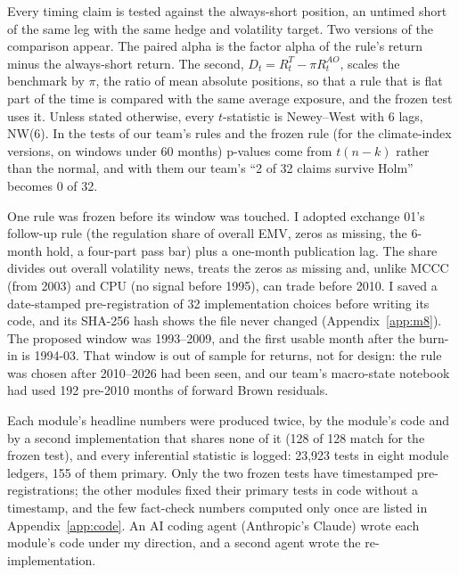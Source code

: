 Every timing claim is tested against the always-short position, an untimed short of the same leg with the same hedge and volatility target. Two versions of the comparison appear. The paired alpha is the factor alpha of the rule's return minus the always-short return. The second, $D_t=R^T_t-\pi R^{AO}_t$, scales the benchmark by $\pi$, the ratio of mean absolute positions, so that a rule that is flat part of the time is compared with the same average exposure, and the frozen test uses it. Unless stated otherwise, every $t$-statistic is Newey--West \citep{nw1987} with 6 lags, NW(6). In the tests of our team's rules and the frozen rule (for the climate-index versions, on windows under 60 months) p-values come from $t(n-k)$ rather than the normal, and with them our team's ``2 of 32 claims survive Holm'' \citep{holm1979} becomes 0 of 32.

One rule was frozen before its window was touched. I adopted exchange 01's follow-up rule (the regulation share of overall EMV, zeros as missing, the 6-month hold, a four-part pass bar) plus a one-month publication lag. The share divides out overall volatility news, treats the zeros as missing and, unlike MCCC (from 2003) and CPU (no signal before 1995), can trade before 2010. I saved a date-stamped pre-registration of 32 implementation choices before writing its code, and its SHA-256 hash shows the file never changed (Appendix~\ref{app:m8}). The proposed window was 1993--2009, and the first usable month after the burn-in is 1994-03. That window is out of sample for returns, not for design: the rule was chosen after 2010--2026 had been seen, and our team's macro-state notebook had used 192 pre-2010 months of forward Brown residuals.

Each module's headline numbers were produced twice, by the module's code and by a second implementation that shares none of it (128 of 128 match for the frozen test), and every inferential statistic is logged: 23,923 tests in eight module ledgers, 155 of them primary. Only the two frozen tests have timestamped pre-registrations; the other modules fixed their primary tests in code without a timestamp, and the few fact-check numbers computed only once are listed in Appendix~\ref{app:code}. An AI coding agent (Anthropic's Claude) wrote each module's code under my direction, and a second agent wrote the re-implementation.

